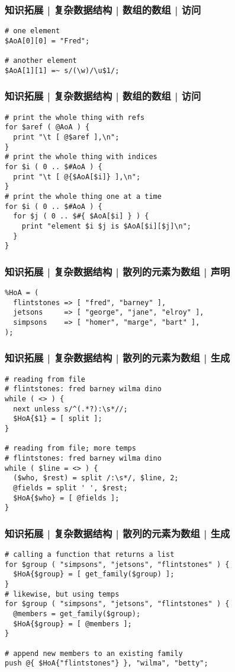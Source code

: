 \begin{frame}[fragile]
  \frametitle{知识拓展 | 复杂数据结构 | 数组的数组 | 访问}
\begin{lstlisting}
# one element
$AoA[0][0] = "Fred";

# another element
$AoA[1][1] =~ s/(\w)/\u$1/;
\end{lstlisting}
\end{frame}

\begin{frame}[fragile]
  \frametitle{知识拓展 | 复杂数据结构 | 数组的数组 | 访问}
\begin{lstlisting}
# print the whole thing with refs
for $aref ( @AoA ) {
  print "\t [ @$aref ],\n";
}
# print the whole thing with indices
for $i ( 0 .. $#AoA ) {
  print "\t [ @{$AoA[$i]} ],\n";
}
# print the whole thing one at a time
for $i ( 0 .. $#AoA ) {
  for $j ( 0 .. $#{ $AoA[$i] } ) {
    print "element $i $j is $AoA[$i][$j]\n";
  }
}
\end{lstlisting}
\end{frame}

\begin{frame}[fragile]
  \frametitle{知识拓展 | 复杂数据结构 | 散列的元素为数组 | 声明}
\begin{lstlisting}
%HoA = (
  flintstones => [ "fred", "barney" ],
  jetsons     => [ "george", "jane", "elroy" ],
  simpsons    => [ "homer", "marge", "bart" ],
);
\end{lstlisting}
\end{frame}

\begin{frame}[fragile]
  \frametitle{知识拓展 | 复杂数据结构 | 散列的元素为数组 | 生成}
\begin{lstlisting}
# reading from file
# flintstones: fred barney wilma dino
while ( <> ) {
  next unless s/^(.*?):\s*//;
  $HoA{$1} = [ split ];
}

# reading from file; more temps
# flintstones: fred barney wilma dino
while ( $line = <> ) {
  ($who, $rest) = split /:\s*/, $line, 2;
  @fields = split ' ', $rest;
  $HoA{$who} = [ @fields ];
}
\end{lstlisting}
\end{frame}

\begin{frame}[fragile]
  \frametitle{知识拓展 | 复杂数据结构 | 散列的元素为数组 | 生成}
\begin{lstlisting}
# calling a function that returns a list
for $group ( "simpsons", "jetsons", "flintstones" ) {
  $HoA{$group} = [ get_family($group) ];
}
# likewise, but using temps
for $group ( "simpsons", "jetsons", "flintstones" ) {
  @members = get_family($group);
  $HoA{$group} = [ @members ];
}

# append new members to an existing family
push @{ $HoA{"flintstones"} }, "wilma", "betty";
\end{lstlisting}
\end{frame}

